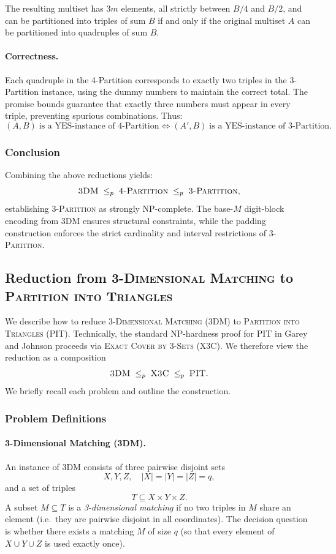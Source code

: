 \documentclass[9pt]{extarticle}
\begin{document}
The resulting multiset has $3m$ elements, all strictly between $B/4$ and $B/2$,
and can be partitioned into triples of sum $B$ if and only if the original
multiset $A$ can be partitioned into quadruples of sum $B$.

\paragraph{Correctness.}
Each quadruple in the 4-Partition corresponds to exactly two triples in the
3-Partition instance, using the dummy numbers to maintain the correct total.
The promise bounds guarantee that exactly three numbers must appear in every
triple, preventing spurious combinations.  
Thus:
\[
(A,B)\;\text{is a YES-instance of 4-Partition}
\iff
(A',B)\;\text{is a YES-instance of 3-Partition}.
\]

\subsubsection*{Conclusion}

Combining the above reductions yields:
\[
\textsc{3DM} \;\le_p\; \textsc{4-Partition} \;\le_p\; \textsc{3-Partition},
\]
establishing \textsc{3-Partition} as strongly NP-complete.
The base-$M$ digit-block encoding from 3DM ensures structural constraints,
while the padding construction enforces the strict cardinality and interval
restrictions of \textsc{3-Partition}.


\subsection{Reduction from \textsc{3-Dimensional Matching} to \textsc{Partition into Triangles}}

We describe how to reduce \textsc{3-Dimensional Matching} (3DM) to
\textsc{Partition into Triangles} (PIT).  Technically, the standard NP-hardness
proof for PIT in Garey and Johnson proceeds via \textsc{Exact Cover by
3-Sets} (X3C).  We therefore view the reduction as a composition
\[
    \textsc{3DM} \;\le_p\; \textsc{X3C} \;\le_p\; \textsc{PIT}.
\]
We briefly recall each problem and outline the construction.

\subsubsection*{Problem Definitions}

\paragraph{3-Dimensional Matching (3DM).}
An instance of 3DM consists of three pairwise disjoint sets
\[
X, Y, Z, \quad |X| = |Y| = |Z| = q,
\]
and a set of triples
\[
T \subseteq X \times Y \times Z.
\]
A subset $M \subseteq T$ is a \emph{3-dimensional matching} if no two triples in
$M$ share an element (i.e.\ they are pairwise disjoint in all coordinates).
The decision question is whether there exists a matching $M$ of size $q$
(so that every element of $X \cup Y \cup Z$ is used exactly once).
\end{document}
